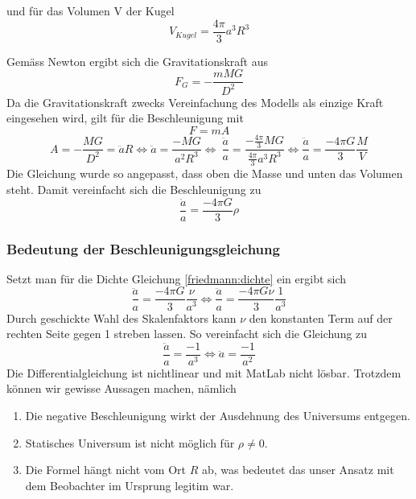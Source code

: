 \begin{refsection}
und für das Volumen V der Kugel
\[V_{Kugel} = \frac{4 \pi }{3} a^3 R^3\]

Gemäss Newton ergibt sich die Gravitationskraft aus
\begin{equation}
F_G = -\frac{m M G}{D^2}
\end{equation}
Da die Gravitationskraft zwecks Vereinfachung des Modells als einzige Kraft eingesehen wird, gilt für die Beschleunigung mit 
\[F = m A\]
\[A = - \frac{M G}{D^2} = \ddot{a} R \Leftrightarrow \ddot{a} = \frac{- M G}{a^2 R^3} \Leftrightarrow\ \frac{\ddot{a}}{a} = \frac{-\frac{4 \pi }{3} M G}{\frac{4 \pi}{3}a^3 R^3} \Leftrightarrow \frac{\ddot{a}}{a} = \frac{- 4 \pi G}{3} \frac{M}{V}\]
Die Gleichung wurde so angepasst, dass oben die Masse und unten das Volumen steht. Damit vereinfacht sich die Beschleunigung zu
\begin{equation}
\frac{\ddot{a}}{a} = \frac{- 4 \pi G}{3} \rho
\end{equation}
\subsubsection{Bedeutung der Beschleunigungsgleichung}
Setzt man für die Dichte Gleichung \ref{friedmann:dichte} ein ergibt sich
\[\frac{\ddot{a}}{a} = \frac{- 4 \pi G}{3} \frac{\nu}{a^3} \Leftrightarrow \frac{\ddot{a}}{a} = \frac{- 4 \pi G \nu}{3} \frac{1}{a^3}\]
Durch geschickte Wahl des Skalenfaktors kann $\nu$ den konstanten Term auf der rechten Seite gegen 1 streben lassen. So vereinfacht sich die Gleichung zu
\[\frac{\ddot{a}}{a} = \frac{-1}{a^3} \Leftrightarrow \ddot{a} = \frac{-1}{a^2}\]
Die Differentialgleichung ist nichtlinear und mit MatLab nicht lösbar. Trotzdem können wir gewisse Aussagen machen, nämlich
\begin{enumerate}
	\item Die negative Beschleunigung wirkt der Ausdehnung des Universums entgegen. 
	\item Statisches Universum ist nicht möglich für $\rho \neq 0$.
	\item Die Formel hängt nicht vom Ort $R$ ab, was bedeutet das unser Ansatz mit dem Beobachter im Ursprung legitim war.
\end{enumerate}


\end{refsection}
